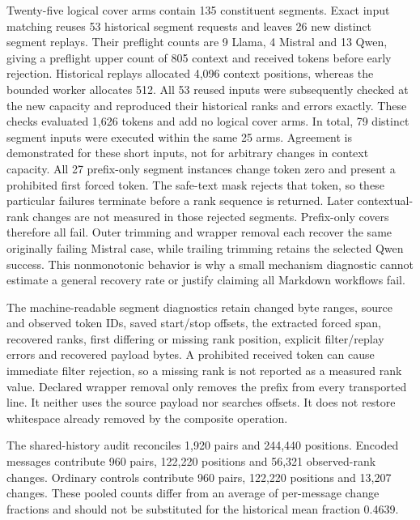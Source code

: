 Twenty-five logical cover arms contain 135 constituent segments. Exact input matching reuses 53 historical segment requests and leaves 26 new distinct segment replays. Their preflight counts are 9 Llama, 4 Mistral and 13 Qwen, giving a preflight upper count of 805 context and received tokens before early rejection. Historical replays allocated 4,096 context positions, whereas the bounded worker allocates 512. All 53 reused inputs were subsequently checked at the new capacity and reproduced their historical ranks and errors exactly. These checks evaluated 1,626 tokens and add no logical cover arms. In total, 79 distinct segment inputs were executed within the same 25 arms. Agreement is demonstrated for these short inputs, not for arbitrary changes in context capacity. All 27 prefix-only segment instances change token zero and present a prohibited first forced token. The safe-text mask rejects that token, so these particular failures terminate before a rank sequence is returned. Later contextual-rank changes are not measured in those rejected segments. Prefix-only covers therefore all fail. Outer trimming and wrapper removal each recover the same originally failing Mistral case, while trailing trimming retains the selected Qwen success. This nonmonotonic behavior is why a small mechanism diagnostic cannot estimate a general recovery rate or justify claiming all Markdown workflows fail.



The machine-readable segment diagnostics retain changed byte ranges, source and observed token IDs, saved start/stop offsets, the extracted forced span, recovered ranks, first differing or missing rank position, explicit filter/replay errors and recovered payload bytes. A prohibited received token can cause immediate filter rejection, so a missing rank is not reported as a measured rank value. Declared wrapper removal only removes the prefix from every transported line. It neither uses the source payload nor searches offsets. It does not restore whitespace already removed by the composite operation.

\label{si:v4-fixed-quant}
The shared-history audit reconciles 1,920 pairs and 244,440 positions. Encoded messages contribute 960 pairs, 122,220 positions and 56,321 observed-rank changes. Ordinary controls contribute 960 pairs, 122,220 positions and 13,207 changes. These pooled counts differ from an average of per-message change fractions and should not be substituted for the historical mean fraction 0.4639.

